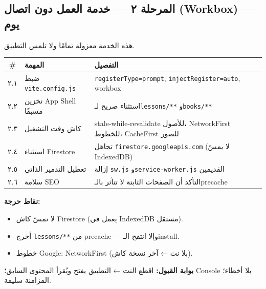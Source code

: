 \documentclass[11pt]{article}
\newcommand{\code}[1]{\textcolor{darkbg}{\texttt{\small #1}}}
\begin{document}
\subsection{المرحلة ٢ — خدمة العمل دون اتصال (Workbox) — يوم}
هذه الخدمة معزولة تمامًا ولا تلمس التطبيق.
\begin{tabular}{@{}c p{6.5cm} p{5cm}@{}}
\toprule
\textbf{\#} & \textbf{المهمة} & \textbf{التفصيل} \\
\midrule
٢.١ & ضبط \code{vite.config.js} & \code{registerType=prompt}, \code{injectRegister=auto}, workbox \\
٢.٢ & تخزين App Shell مسبقًا & استثناء صريح لـ\code{lessons/**} و\code{books/**} \\
٢.٣ & كاش وقت التشغيل & stale-while-revalidate للأصول، NetworkFirst للخطوط، CacheFirst للصور \\
٢.٤ & استثناء Firestore & تجاهل \code{firestore.googleapis.com} (لا يمسّ IndexedDB) \\
٢.٥ & تعطيل التدمير الذاتي & إزالة \code{sw.js} و\code{service-worker.js} القديمين \\
٢.٦ & سلامة SEO & التأكد أن الصفحات الثابتة لا تتأثر بالـprecache \\
\bottomrule
\end{tabular}
\begin{riskbox}
\textbf{نقاط حرجة:}
\begin{itemize}
\item لا تمسّ كاش Firestore (يعمل في IndexedDB مستقل).
\item أخرج \code{lessons/**} من precache — وإلا انتفخ الـinstall.
\item خطوط Google: NetworkFirst (بلا نت ← آخر نسخة كاش).
\end{itemize}
\end{riskbox}
\begin{okbox}
\textbf{بوابة القبول:} اقطع النت ← التطبيق يفتح ويُقرأ المحتوى السابق؛ Console بلا أخطاء؛ المزامنة سليمة.
\end{okbox}
\end{document}
